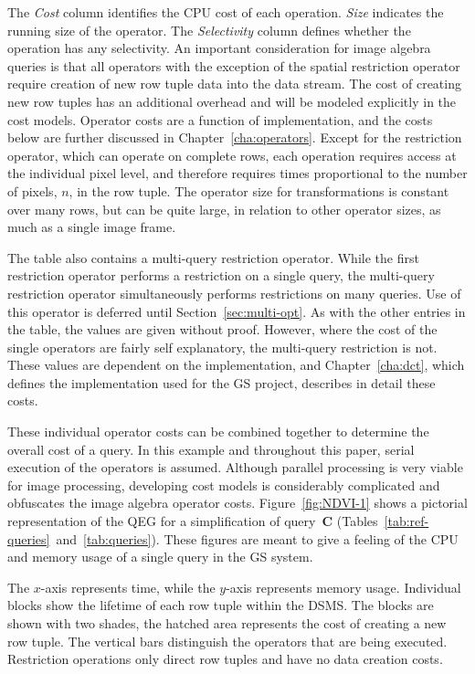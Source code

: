 \documentclass{ucdthesis}       %
\newcommand{\qry}[1]{{\bf #1}}
\begin{document}
The \emph{Cost} column identifies the \ac{CPU} cost of each operation.
\emph{Size} indicates the running size of the operator.  The
\emph{Selectivity} column defines whether the operation has any
selectivity.  An important consideration for image algebra queries is
that all operators with the exception of the spatial restriction
operator require creation of new row tuple data into the data stream.
The cost of creating new row tuples has an additional overhead and
will be modeled explicitly in the cost models.  Operator costs are a
function of implementation, and the costs below are further discussed
in Chapter~\ref{cha:operators}.  Except for the restriction operator,
which can operate on complete rows, each operation requires access at
the individual pixel level, and therefore requires times proportional
to the number of pixels, $n$, in the row tuple.  The operator size for
transformations is constant over many rows, but can be quite large, in
relation to other operator sizes, as much as a single image frame.

The table also contains a multi-query restriction operator.  While the
first restriction operator performs a restriction on a single query,
the multi-query restriction operator simultaneously performs
restrictions on many queries.  Use of this operator is deferred until
Section~\ref{sec:multi-opt}.  As with the other entries in the table,
the values are given without proof.  However, where the cost of the
single operators are fairly self explanatory, the multi-query
restriction is not.  These values are dependent on the implementation,
and Chapter~\ref{cha:dct}, which defines the implementation used for
the \ac{GS} project, describes in detail these costs.

These individual operator costs can be combined together to determine
the overall cost of a query.  In this example and throughout this
paper, serial execution of the operators is assumed.  Although
parallel processing is very viable for image processing, developing
cost models is considerably complicated and obfuscates the image
algebra operator costs.  Figure~\ref{fig:NDVI-1} shows a pictorial
representation of the \ac{QEG} for a simplification of query~\qry{C}
(Tables~\ref{tab:ref-queries}~and~\ref{tab:queries}).  These figures
are meant to give a feeling of the \ac{CPU} and memory usage of a
single query in the \ac{GS} system.

The $x$-axis represents time, while the $y$-axis represents memory
usage.  Individual blocks show the lifetime of each row tuple within
the \ac{DSMS}.  The blocks are shown with two shades, the hatched area
represents the cost of creating a new row tuple.  The vertical bars
distinguish the operators that are being executed.  Restriction
operations only direct row tuples and have no data creation costs.
\end{document}
